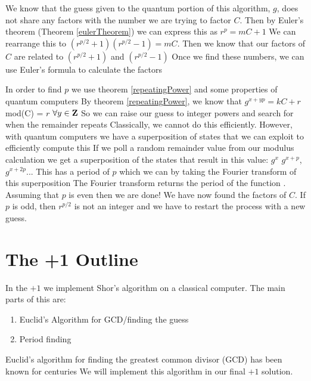 \documentclass[a4paper]{article}
\begin{document}
We know that the guess given to the quantum portion of this algorithm, $g$, does not share any factors with the number we are trying to factor
 $C$. Then by Euler's theorem (Theorem \ref{eulerTheorem}) we can express this as $r^p = mC + 1$
 We can rearrange this to $(r^{p/2} + 1)(r^{p/2} - 1) = mC$. Then we know that our factors of $C$ are related to $(r^{p/2} + 1)$ and $(r^{p/2} - 1)$
 Once we find these numbers, we can use Euler's formula to calculate the factors


In order to find $p$ we use theorem \ref{repeatingPower} and some properties of quantum computers
 By theorem \ref{repeatingPower}, we know that $g^{x + yp} = kC + r$ mod(C) = $r$ $\forall y \in \mathbf{Z}$
 So we can raise our guess to integer powers and search for when the remainder repeats
 Classically, we cannot do this efficiently. However, with quantum computers we have a superposition of states that we can exploit to efficiently compute this
 If we poll a random remainder value from our modulus calculation we get a superposition of the states that result in this value: $g^{x}$
 $g^{x + p}$, $g^{x+2p}$... This has a period of $p$ which we can by taking the Fourier transform of this superposition
 The Fourier transform returns the period of the function \cite{shor}. Assuming that $p$ is even
 then we are done! We have now found the factors of $C$. If $p$ is odd, then $r^{p/2}$ is not an integer
 and we have to restart the process with a new guess. 



\section{The +1 Outline}

In the $+1$ we implement Shor's algorithm on a classical computer. The main parts of this are:

\begin{enumerate}

    \item Euclid's Algorithm for GCD/finding the guess

    \item Period finding

\end{enumerate}



Euclid's algorithm for finding the greatest common divisor (GCD) has been known for centuries
 We will implement this algorithm in our final $+1$ solution. 
\end{document}
